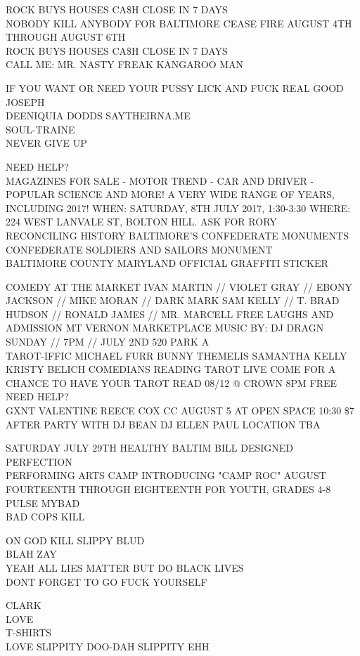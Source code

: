 \documentclass[10pt,letterpaper]{article}
\begin{document}
ROCK BUYS HOUSES CA\$H CLOSE IN 7 DAYS\\
NOBODY KILL ANYBODY FOR BALTIMORE CEASE FIRE AUGUST 4TH THROUGH AUGUST 6TH\\
ROCK BUYS HOUSES CA\$H CLOSE IN 7 DAYS\\
CALL ME: MR. NASTY FREAK KANGAROO MAN

IF YOU WANT OR NEED YOUR PUSSY LICK AND FUCK REAL GOOD JOSEPH\\
DEENIQUIA DODDS SAYTHEIRNA.ME\\
SOUL{-}TRAINE\\
NEVER GIVE UP

NEED HELP?\\
MAGAZINES FOR SALE {-} MOTOR TREND {-} CAR AND DRIVER {-} POPULAR SCIENCE AND MORE!  A VERY WIDE RANGE OF YEARS, INCLUDING 2017!  WHEN: SATURDAY, 8TH JULY 2017, 1:30{-}3:30 WHERE: 224 WEST LANVALE ST, BOLTON HILL.  ASK FOR RORY\\
RECONCILING HISTORY BALTIMORE'S CONFEDERATE MONUMENTS CONFEDERATE SOLDIERS AND SAILORS MONUMENT\\
BALTIMORE COUNTY MARYLAND OFFICIAL GRAFFITI STICKER

COMEDY AT THE MARKET IVAN MARTIN // VIOLET GRAY  // EBONY JACKSON // MIKE MORAN // DARK MARK SAM KELLY // T. BRAD HUDSON // RONALD JAMES // MR. MARCELL FREE LAUGHS AND ADMISSION MT VERNON MARKETPLACE MUSIC BY: DJ DRAGN SUNDAY // 7PM // JULY 2ND 520 PARK A\\
TAROT{-}IFFIC MICHAEL FURR BUNNY THEMELIS SAMANTHA KELLY KRISTY BELICH COMEDIANS READING TAROT LIVE COME FOR A CHANCE TO HAVE YOUR TAROT READ 08/12 @ CROWN 8PM FREE\\
NEED HELP?\\
GXNT VALENTINE REECE COX CC AUGUST 5 AT OPEN SPACE 10:30 \$7 AFTER PARTY WITH DJ BEAN DJ ELLEN PAUL LOCATION TBA

SATURDAY JULY 29TH HEALTHY BALTIM BILL DESIGNED PERFECTION\\
PERFORMING ARTS CAMP INTRODUCING "CAMP ROC" AUGUST FOURTEENTH THROUGH EIGHTEENTH FOR YOUTH, GRADES 4{-}8\\
PULSE MYBAD\\
BAD COPS KILL

ON GOD KILL SLIPPY BLUD\\
BLAH ZAY\\
YEAH ALL LIES MATTER BUT DO BLACK LIVES\\
DONT FORGET TO GO FUCK YOURSELF

CLARK\\
LOVE\\
T{-}SHIRTS\\
LOVE SLIPPITY DOO{-}DAH SLIPPITY EHH
\end{document}
